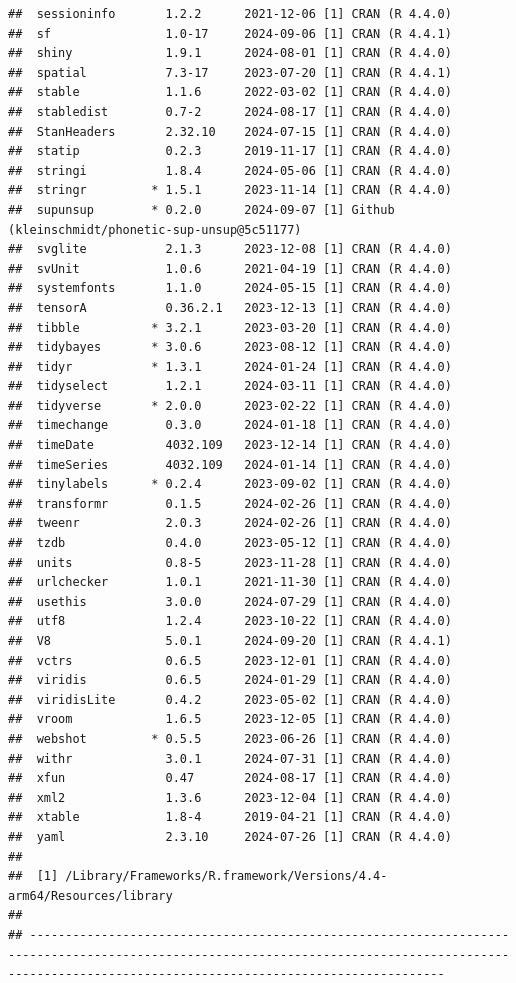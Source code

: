 \documentclass[
  11pt,
  man,mask,floatsintext]{apa6}
\begin{document}
\begin{verbatim}
##  sessioninfo       1.2.2      2021-12-06 [1] CRAN (R 4.4.0)
##  sf                1.0-17     2024-09-06 [1] CRAN (R 4.4.1)
##  shiny             1.9.1      2024-08-01 [1] CRAN (R 4.4.0)
##  spatial           7.3-17     2023-07-20 [1] CRAN (R 4.4.1)
##  stable            1.1.6      2022-03-02 [1] CRAN (R 4.4.0)
##  stabledist        0.7-2      2024-08-17 [1] CRAN (R 4.4.0)
##  StanHeaders       2.32.10    2024-07-15 [1] CRAN (R 4.4.0)
##  statip            0.2.3      2019-11-17 [1] CRAN (R 4.4.0)
##  stringi           1.8.4      2024-05-06 [1] CRAN (R 4.4.0)
##  stringr         * 1.5.1      2023-11-14 [1] CRAN (R 4.4.0)
##  supunsup        * 0.2.0      2024-09-07 [1] Github (kleinschmidt/phonetic-sup-unsup@5c51177)
##  svglite           2.1.3      2023-12-08 [1] CRAN (R 4.4.0)
##  svUnit            1.0.6      2021-04-19 [1] CRAN (R 4.4.0)
##  systemfonts       1.1.0      2024-05-15 [1] CRAN (R 4.4.0)
##  tensorA           0.36.2.1   2023-12-13 [1] CRAN (R 4.4.0)
##  tibble          * 3.2.1      2023-03-20 [1] CRAN (R 4.4.0)
##  tidybayes       * 3.0.6      2023-08-12 [1] CRAN (R 4.4.0)
##  tidyr           * 1.3.1      2024-01-24 [1] CRAN (R 4.4.0)
##  tidyselect        1.2.1      2024-03-11 [1] CRAN (R 4.4.0)
##  tidyverse       * 2.0.0      2023-02-22 [1] CRAN (R 4.4.0)
##  timechange        0.3.0      2024-01-18 [1] CRAN (R 4.4.0)
##  timeDate          4032.109   2023-12-14 [1] CRAN (R 4.4.0)
##  timeSeries        4032.109   2024-01-14 [1] CRAN (R 4.4.0)
##  tinylabels      * 0.2.4      2023-09-02 [1] CRAN (R 4.4.0)
##  transformr        0.1.5      2024-02-26 [1] CRAN (R 4.4.0)
##  tweenr            2.0.3      2024-02-26 [1] CRAN (R 4.4.0)
##  tzdb              0.4.0      2023-05-12 [1] CRAN (R 4.4.0)
##  units             0.8-5      2023-11-28 [1] CRAN (R 4.4.0)
##  urlchecker        1.0.1      2021-11-30 [1] CRAN (R 4.4.0)
##  usethis           3.0.0      2024-07-29 [1] CRAN (R 4.4.0)
##  utf8              1.2.4      2023-10-22 [1] CRAN (R 4.4.0)
##  V8                5.0.1      2024-09-20 [1] CRAN (R 4.4.1)
##  vctrs             0.6.5      2023-12-01 [1] CRAN (R 4.4.0)
##  viridis           0.6.5      2024-01-29 [1] CRAN (R 4.4.0)
##  viridisLite       0.4.2      2023-05-02 [1] CRAN (R 4.4.0)
##  vroom             1.6.5      2023-12-05 [1] CRAN (R 4.4.0)
##  webshot         * 0.5.5      2023-06-26 [1] CRAN (R 4.4.0)
##  withr             3.0.1      2024-07-31 [1] CRAN (R 4.4.0)
##  xfun              0.47       2024-08-17 [1] CRAN (R 4.4.0)
##  xml2              1.3.6      2023-12-04 [1] CRAN (R 4.4.0)
##  xtable            1.8-4      2019-04-21 [1] CRAN (R 4.4.0)
##  yaml              2.3.10     2024-07-26 [1] CRAN (R 4.4.0)
## 
##  [1] /Library/Frameworks/R.framework/Versions/4.4-arm64/Resources/library
## 
## ------------------------------------------------------------------------------------------------------------------------------------------------------------------------------------------------------
\end{verbatim}


\printbibliography
\end{document}
